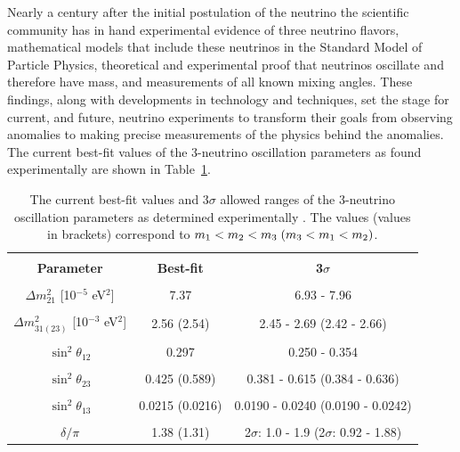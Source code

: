 Nearly a century after the initial postulation of the neutrino the scientific community has in hand experimental evidence of three neutrino flavors, mathematical models that include these neutrinos in the Standard Model of Particle Physics, theoretical and experimental proof that neutrinos oscillate and therefore have mass, and measurements of all known mixing angles.
These findings, along with developments in technology and techniques, set the stage for current, and future, neutrino experiments to transform their goals from observing anomalies to making precise measurements of the physics behind the anomalies.
The current best-fit values of the 3-neutrino oscillation parameters as found experimentally are shown in Table~\ref{tab:ParamValues}.


\begin{table}
	\centering
	\begin{tabular}{ccc}
		\hline
		\vspace{-0.3cm} \\ 
		\textbf{Parameter} & \textbf{Best-fit} & \textbf{3$\sigma$} \vspace{0.1cm} \\ 
		\hline 
		\vspace{-0.3cm} \\
		$\Delta m^2_{21}$ [10$^{-5}$ eV$^2$] & 7.37 & 6.93 - 7.96 \\ 
		\vspace{-0.3cm} \\
		$\Delta m^2_{31(23)}$ [10$^{-3}$ eV$^2$] & 2.56 (2.54) & 2.45 - 2.69 (2.42 - 2.66) \\ 
		\vspace{-0.3cm} \\
		$\sin^2\theta_{12}$  & 0.297 & 0.250 - 0.354 \\ 
		\vspace{-0.3cm} \\
		$\sin^2\theta_{23}$  & 0.425 (0.589) & 0.381 - 0.615 (0.384 - 0.636) \\ 
		\vspace{-0.3cm} \\
		$\sin^2\theta_{13}$  & 0.0215 (0.0216) & 0.0190 - 0.0240 (0.0190 - 0.0242) \\ 
		\vspace{-0.3cm} \\
		$\delta/\pi$ & 1.38 (1.31) & 2$\sigma$: 1.0 - 1.9 (2$\sigma$: 0.92 - 1.88) \\ 
		\hline 
	\end{tabular} 
	\caption{The current best-fit values and 3$\sigma$ allowed ranges of the 3-neutrino oscillation parameters as determined experimentally \cite{PDG}. The values (values in brackets) correspond to $m_1 < m_2 < m_3 \hspace{0.1cm} (m_3 < m_1 < m_2)$.}
	\label{tab:ParamValues}
\end{table}

